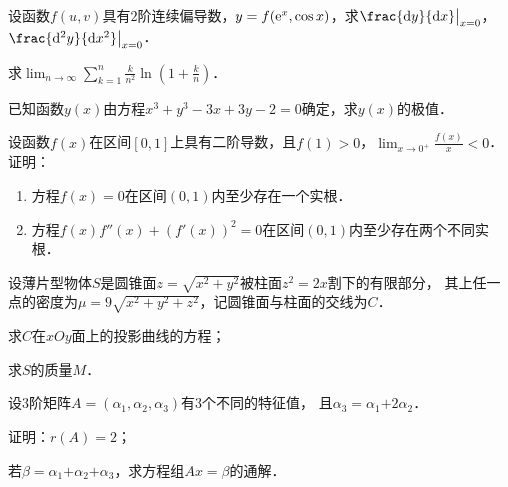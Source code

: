 \documentclass[plain,noanswer,medmath]{../../template/jnuexam}
\begin{document}


\begin{problem}[points=10]
设函数$f(u,v)$具有$2$阶连续偏导数，$y = f(\mathrm{e}^x,\cos x)$，求$\frac{\dy}{\dx}\big|_{x = 0}$，$\frac{\d^2y}{\dx^2}\big|_{x = 0}$．
\end{problem}


\begin{problem}[points=10]
求$\lim_{n \to \infty} \sum_{k = 1}^n \frac{k}{n^2} \ln \left(1 + \frac{k}{n} \right)$．
\end{problem}


\begin{problem}[points=10]
已知函数$y(x)$由方程$x^3 + y^3 - 3x + 3y - 2 = 0$确定，求$y(x)$的极值．
\end{problem}


\begin{problem}[points=11]
设函数$f(x)$在区间$[0,1]$上具有二阶导数，且$f(1) > 0$，$\lim_{x \to 0^+} \frac{f(x)}{x} < 0$．证明：
\begin{enumerate}
\item 方程$f(x) = 0$在区间$(0,1)$内至少存在一个实根．
\item 方程$f(x)f''(x) + \left(f'(x) \right)^2 = 0$在区间$(0,1)$内至少存在两个不同实根．
\end{enumerate}
\end{problem}


\begin{problem}[points=10]
设薄片型物体$S$是圆锥面$z = \sqrt{x^2 + y^2}$被柱面$z^2 = 2x$割下的有限部分，
其上任一点的密度为$\mu = 9\sqrt{x^2 + y^2 + z^2}$，记圆锥面与柱面的交线为$C$．\par
\begin{enumerate*}
\item 求$C$在$xOy$面上的投影曲线的方程；
\item 求$S$的质量$M$．
\end{enumerate*}
\end{problem}


\begin{problem}[points=11]
设$3$阶矩阵$A= (\alpha_1,\alpha_2,\alpha_3)$有$3$个不同的特征值，
且$\alpha_3=\alpha_1\text{+}2\alpha_2$．\par
\begin{enumerate*}
\item 证明：$r(A) = 2$；
\item 若$\beta =\alpha_1\text{+}\alpha_2\text{+}\alpha_3$，求方程组$Ax = \beta$的通解．
\end{enumerate*}
\end{problem}
\end{document}
